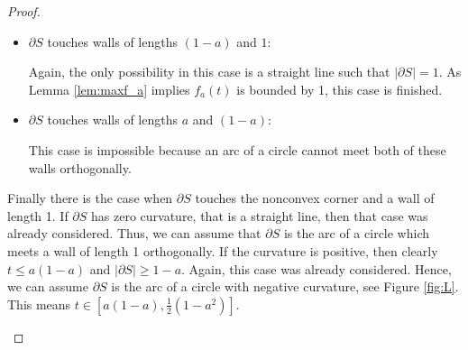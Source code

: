 \documentclass[leqno]{article}
\numberwithin{equation}{section}
\theoremstyle{definition}
\theoremstyle{remark}
\theoremstyle{plain}
\begin{document}
{\begin{proof}
\begin{itemize}
\begin{itemize}
        In this case the only possibility for $\partial S$ is a straight line. Thus, $|\partial S| = 1-a$. Furthermore, the geometry requires $t \in [0,a(1-a)]$. Assume that $0 < a \leq \gamma = \frac{1}{1+\pi}$. Then we have $\frac{1-a}{\pi} \geq \frac{1}{1+\pi}$. In other words, we have $a \leq \frac{1}{1+\pi} \leq \frac{1-a}{\pi}$. Multiplying through by $(1-a)$ gives us
        \[
             \frac{1}{\pi}(1-a)^2 \geq a(1-a) \geq t.
        \]
        Now using the fact that $(\pi x)^{1/2}$ is a non-decreasing function, we have
        \begin{align*}
            |\partial S| &= 1-a \\
            &= \left(\pi \frac{1}{\pi}(1-a)^2\right)^{1/2} \\
            &\geq (\pi t)^{1/2} \\
            &\geq f_a(t).
        \end{align*}

        Now assume that $\gamma < a < 1$. If $0 \leq t \leq \frac{1}{\pi}(1-a)^2$, then the same argument works. If $\frac{1}{\pi}(1-a)^2 < t \leq a(1-a)$, then $|\partial S| = f_a(t)$, and we have our result. Thus, the only case to check is if $a(1-a) < t \leq \frac{1}{2}(1-a^2)$. However, $t \in [0,a(1-a)]$. Therefore, this case is finished.
        \item $\partial S$ touches walls of lengths $(1-a)$ and $1$: 
        
        Again, the only possibility in this case is a straight line such that $|\partial S| = 1$.  As Lemma \ref{lem:maxf_a} implies  $f_a(t)$ is bounded by 1, this case is finished.
        
        \item $\partial S$ touches walls of lengths $a$ and $(1-a)$:

        This case is impossible because an arc of a circle cannot meet both of these walls orthogonally.
    \end{itemize}
    Finally there is the case when $\partial S$ touches the nonconvex corner and a wall of length 1. If $\partial S$ has zero curvature, that is a straight line, then that case was already considered. Thus, we can assume that $\partial S$ is the arc of a circle which meets a wall of length 1 orthogonally. If the curvature is positive, then clearly $t \leq a(1-a)$ and $|\partial S| \geq 1-a$. Again, this case was already considered. Hence, we can assume $\partial S$ is the arc of a circle with negative curvature, see Figure \ref{fig:L}. This means $t \in [a(1-a),\frac{1}{2}(1-a^2)]$.


\end{itemize}
\end{proof}}
\end{document}
